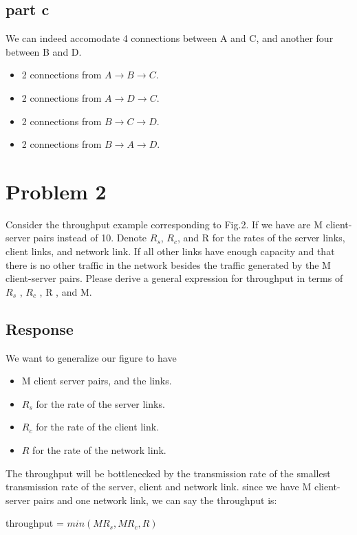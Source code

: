 \documentclass{article}
\begin{document}
\subsection{part c}

We can indeed accomodate 4 connections between A and C, and another four between B and D.

\begin{itemize}
    \item 2 connections from $A \rightarrow B \rightarrow C$.
    \item 2 connections from $A \rightarrow D \rightarrow C$.
    \item 2 connections from $B \rightarrow C \rightarrow D$.
    \item 2 connections from $B \rightarrow A \rightarrow D$.
\end{itemize}

\section{Problem 2}

Consider the throughput example corresponding to Fig.2. If we have are M client-server pairs instead of 10. Denote $R_s$, $R_c$, and R for the rates of the server links, client links, and network link. If all other links have enough capacity and that there is no other traffic in the network besides the traffic generated by the M client-server pairs. Please derive a general expression for throughput in terms of $R_s$ , $R_c$ , R , and M.

\subsection{Response}

We want to generalize our figure to have
\begin{itemize}
    \item M client server pairs, and the links.
    \item $R_s$ for the rate of the server links.
    \item $R_c$ for the rate of the client link.
    \item $R$ for the rate of the network link.
\end{itemize}

The throughput will be bottlenecked by the transmission rate of the smallest transmission rate of the server, client and network link. since we have M client-server pairs and one network link, we can say the throughput is:
\begin{center}
    throughput = $min(MR_s, MR_c,R)$
\end{center}
\end{document}
